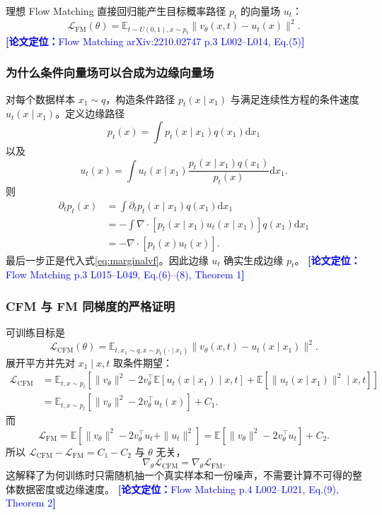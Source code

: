 \documentclass[11pt,a4paper]{ctexart}
\newcommand{\paperref}[1]{\textcolor{Blue}{\footnotesize\textbf{[论文定位：}#1\textbf{]}}}
\newcommand{\E}{\mathbb{E}}
\newcommand{\dd}{\mathrm{d}}
\begin{document}
理想 Flow Matching 直接回归能产生目标概率路径 $p_t$ 的向量场 $u_t$：
\begin{equation}
\mathcal L_{\mathrm{FM}}(\theta)=\E_{t\sim U(0,1),x\sim p_t}
\|v_\theta(x,t)-u_t(x)\|^2.
\end{equation}
\paperref{Flow Matching arXiv:2210.02747 p.3 L002--L014, Eq.(5)}

\subsubsection*{为什么条件向量场可以合成为边缘向量场}

对每个数据样本 $x_1\sim q$，构造条件路径 $p_t(x\mid x_1)$ 与满足连续性方程的条件速度 $u_t(x\mid x_1)$。定义边缘路径
\begin{equation}
p_t(x)=\int p_t(x\mid x_1)q(x_1)\dd x_1
\end{equation}
以及
\begin{equation}
u_t(x)=\int u_t(x\mid x_1)
\frac{p_t(x\mid x_1)q(x_1)}{p_t(x)}\dd x_1.
\label{eq:marginalvf}
\end{equation}
则
\begin{align}
\partial_t p_t(x)
&=\int \partial_t p_t(x\mid x_1)q(x_1)\dd x_1\\
&=-\int\nabla\cdot[p_t(x\mid x_1)u_t(x\mid x_1)]q(x_1)\dd x_1\\
&=-\nabla\cdot\left[p_t(x)u_t(x)\right].
\end{align}
最后一步正是代入式\eqref{eq:marginalvf}。因此边缘 $u_t$ 确实生成边缘 $p_t$。
\paperref{Flow Matching p.3 L015--L049, Eq.(6)--(8), Theorem 1}

\subsubsection*{CFM 与 FM 同梯度的严格证明}

可训练目标是
\begin{equation}
\mathcal L_{\mathrm{CFM}}(\theta)=
\E_{t,x_1\sim q,x\sim p_t(\cdot\mid x_1)}
\|v_\theta(x,t)-u_t(x\mid x_1)\|^2.
\end{equation}
展开平方并先对 $x_1\mid x,t$ 取条件期望：
\begin{align}
\mathcal L_{\mathrm{CFM}}
&=\E_{t,x\sim p_t}\left[
\|v_\theta\|^2-2v_\theta^\top\E[u_t(x\mid x_1)\mid x,t]
+\E[\|u_t(x\mid x_1)\|^2\mid x,t]\right]\\
&=\E_{t,x\sim p_t}\left[\|v_\theta\|^2-2v_\theta^\top u_t(x)\right]
+C_1.
\end{align}
而
\begin{equation}
\mathcal L_{\mathrm{FM}}
=\E[\|v_\theta\|^2-2v_\theta^\top u_t+\|u_t\|^2]
=\E[\|v_\theta\|^2-2v_\theta^\top u_t]+C_2.
\end{equation}
所以 $\mathcal L_{\mathrm{CFM}}-\mathcal L_{\mathrm{FM}}=C_1-C_2$ 与 $\theta$ 无关，
\begin{equation}
\nabla_\theta\mathcal L_{\mathrm{CFM}}=\nabla_\theta\mathcal L_{\mathrm{FM}}.
\end{equation}
这解释了为何训练时只需随机抽一个真实样本和一份噪声，不需要计算不可得的整体数据密度或边缘速度。
\paperref{Flow Matching p.4 L002--L021, Eq.(9), Theorem 2}
\end{document}
